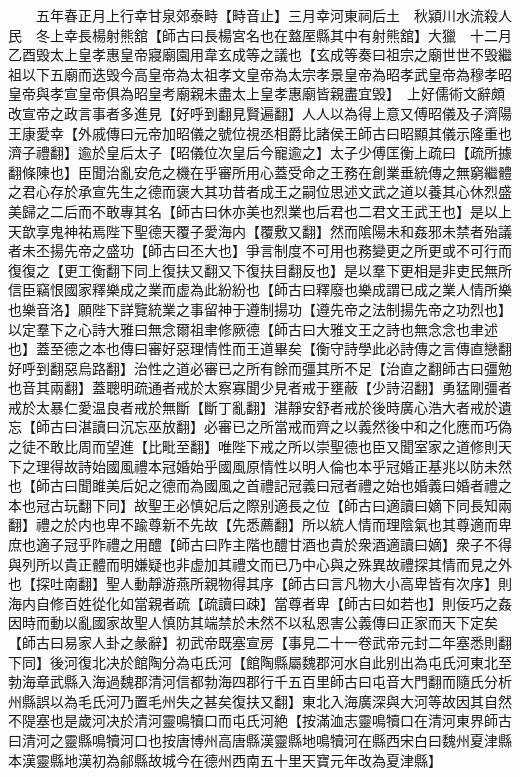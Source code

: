 　　五年春正月上行幸甘泉郊泰畤【畤音止】三月幸河東祠后土　秋潁川水流殺人民　冬上幸長楊射熊舘【師古曰長楊宮名也在盩厔縣其中有射熊舘】大獵　十二月乙酉毁太上皇孝惠皇帝寢廟園用韋玄成等之議也【玄成等奏曰祖宗之廟世世不毁繼祖以下五廟而迭毁今高皇帝為太祖孝文皇帝為太宗孝景皇帝為昭孝武皇帝為穆孝昭皇帝與孝宣皇帝俱為昭皇考廟親未盡太上皇孝惠廟皆親盡宜毁】　上好儒術文辭頗改宣帝之政言事者多進見【好呼到翻見賢遍翻】人人以為得上意又傅昭儀及子濟陽王康愛幸【外戚傳曰元帝加昭儀之號位視丞相爵比諸侯王師古曰昭顯其儀示隆重也濟子禮翻】逾於皇后太子【昭儀位次皇后今寵逾之】太子少傅匡衡上疏曰【疏所據翻條陳也】臣聞治亂安危之機在乎審所用心蓋受命之王務在創業垂統傳之無窮繼體之君心存於承宣先生之德而褒大其功昔者成王之嗣位思述文武之道以養其心休烈盛美歸之二后而不敢專其名【師古曰休亦美也烈業也后君也二君文王武王也】是以上天歆享鬼神祐焉陛下聖德天覆子愛海内【覆敷又翻】然而隂陽未和姦邪未禁者殆議者未丕揚先帝之盛功【師古曰丕大也】爭言制度不可用也務變更之所更或不可行而復復之【更工衡翻下同上復扶又翻又下復扶目翻反也】是以羣下更相是非吏民無所信臣竊恨國家釋樂成之業而虚為此紛紛也【師古曰釋廢也樂成謂已成之業人情所樂也樂音洛】願陛下詳覽統業之事留神于遵制揚功【遵先帝之法制揚先帝之功烈也】以定羣下之心詩大雅曰無念爾祖聿修厥德【師古曰大雅文王之詩也無念念也聿述也】蓋至德之本也傳曰審好惡理情性而王道畢矣【衡守詩學此必詩傳之言傳直戀翻好呼到翻惡烏路翻】治性之道必審已之所有餘而彊其所不足【治直之翻師古曰彊勉也音其兩翻】蓋聰明疏通者戒於太察寡聞少見者戒于壅蔽【少詩沼翻】勇猛剛彊者戒於太暴仁愛温良者戒於無斷【斷丁亂翻】湛靜安舒者戒於後時廣心浩大者戒於遺忘【師古曰湛讀曰沉忘巫放翻】必審已之所當戒而齊之以義然後中和之化應而巧偽之徒不敢比周而望進【比毗至翻】唯陛下戒之所以崇聖德也臣又聞室家之道修則天下之理得故詩始國風禮本冠婚始乎國風原情性以明人倫也本乎冠婚正基兆以防未然也【師古曰聞雎美后妃之德而為國風之首禮記冠義曰冠者禮之始也婚義曰婚者禮之本也冠古玩翻下同】故聖王必慎妃后之際别適長之位【師古曰適讀曰嫡下同長知兩翻】禮之於内也卑不踰尊新不先故【先悉薦翻】所以統人情而理陰氣也其尊適而卑庶也適子冠乎阼禮之用醴【師古曰阼主階也醴甘酒也貴於衆酒適讀曰嫡】衆子不得與列所以貴正體而明嫌疑也非虚加其禮文而已乃中心與之殊異故禮探其情而見之外也【探吐南翻】聖人動靜游燕所親物得其序【師古曰言凡物大小高卑皆有次序】則海内自修百姓從化如當親者疏【疏讀曰疎】當尊者卑【師古曰如若也】則佞巧之姦因時而動以亂國家故聖人慎防其端禁於未然不以私恩害公義傳曰正家而天下定矣【師古曰易家人卦之彖辭】初武帝既塞宣房【事見二十一卷武帝元封二年塞悉則翻下同】後河復北决於館陶分為屯氏河【館陶縣屬魏郡河水自此别出為屯氏河東北至勃海章武縣入海過魏郡清河信都勃海四郡行千五百里師古曰屯音大門翻而隨氏分析州縣誤以為毛氏河乃置毛州失之甚矣復扶又翻】東北入海廣深與大河等故因其自然不隄塞也是歲河决於清河靈鳴犢口而屯氏河絶【按滿洫志靈鳴犢口在清河東界師古曰清河之靈縣鳴犢河口也按唐博州高唐縣漢靈縣地鳴犢河在縣西宋白曰魏州夏津縣本漢靈縣地漢初為鄃縣故城今在德州西南五十里天寶元年改為夏津縣】

